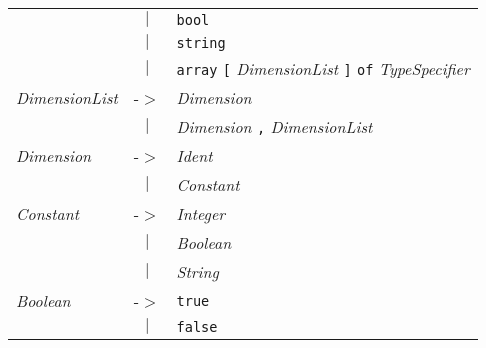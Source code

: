 \documentclass{article}
\begin{document}
\begin{center}
\begin{tabular}{lll}
 & \multicolumn{1}{c}{\textbf{$|$}} & \texttt{bool} \\
 & \multicolumn{1}{c}{\textbf{$|$}} & \texttt{string} \\
 & \multicolumn{1}{c}{\textbf{$|$}} & \texttt{array} \texttt{[} \textit{DimensionList} \texttt{]} \texttt{of} \textit{TypeSpecifier} \\
\textit{DimensionList} & -$>$ & \textit{Dimension} \\
 & \multicolumn{1}{c}{\textbf{$|$}} & \textit{Dimension} \texttt{,} \textit{DimensionList} \\
\textit{Dimension} & -$>$ & \textit{Ident} \\
 & \multicolumn{1}{c}{\textbf{$|$}} & \textit{Constant} \\
\textit{Constant} & -$>$ & \textit{Integer} \\
 & \multicolumn{1}{c}{\textbf{$|$}} & \textit{Boolean} \\
 & \multicolumn{1}{c}{\textbf{$|$}} & \textit{String} \\
\textit{Boolean} & -$>$ & \texttt{true} \\
 & \multicolumn{1}{c}{\textbf{$|$}} & \texttt{false} \\
\end{tabular}\end{center}

\end{document}
